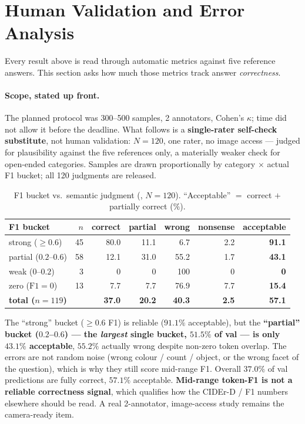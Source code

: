 \section{Human Validation and Error Analysis}
\label{sec:human}

Every result above is read through automatic metrics against five reference
answers. This section asks how much those metrics track answer \emph{correctness}.

\paragraph{Scope, stated up front.}
The planned protocol was 300--500 samples, 2 annotators, Cohen's $\kappa$; time
did not allow it before the deadline. What follows is a \textbf{single-rater
self-check substitute}, not human validation: $N = 120$, one rater, no image
access --- judged for plausibility against the five references only, a materially
weaker check for open-ended categories. Samples are drawn proportionally by
category $\times$ actual F1 bucket; all 120 judgments are released.

\begin{table}[t]
  \centering
  \caption{F1 bucket vs.\ semantic judgment (\multitoken{}, $N=120$).
  ``Acceptable'' $=$ correct $+$ partially correct ($\%$).}
  \label{tab:human}
  \begin{tabular}{lrrrrrr}
    \toprule
    F1 bucket & $n$ & correct & partial & wrong & nonsense & acceptable \\
    \midrule
    strong ($\ge 0.6$)    & 45 & 80.0 & 11.1 & 6.7  & 2.2 & \textbf{91.1} \\
    partial ($0.2$--$0.6$) & 58 & 12.1 & 31.0 & 55.2 & 1.7 & \textbf{43.1} \\
    weak ($0$--$0.2$)     & 3  & 0    & 0    & 100  & 0   & \textbf{0} \\
    zero ($\text{F1}=0$)  & 13 & 7.7  & 7.7  & 76.9 & 7.7 & \textbf{15.4} \\
    \midrule
    \textbf{total ($n=119$)} & & \textbf{37.0} & \textbf{20.2} & \textbf{40.3} & \textbf{2.5} & \textbf{57.1} \\
    \bottomrule
  \end{tabular}
\end{table}

The ``strong'' bucket ($\ge 0.6$ F1) is reliable ($91.1\%$ acceptable), but the
\textbf{``partial'' bucket ($0.2$--$0.6$) --- the \emph{largest} single bucket,
$51.5\%$ of val --- is only $43.1\%$ acceptable}, $55.2\%$ actually wrong despite
non-zero token overlap. The errors are not random noise (wrong colour / count /
object, or the wrong facet of the question), which is why they still score
mid-range F1. Overall $37.0\%$ of val predictions are fully correct, $57.1\%$
acceptable. \textbf{Mid-range token-F1 is not a reliable correctness signal},
which qualifies how the CIDEr-D / F1 numbers elsewhere should be read. A real
2-annotator, image-access study remains the camera-ready item.

